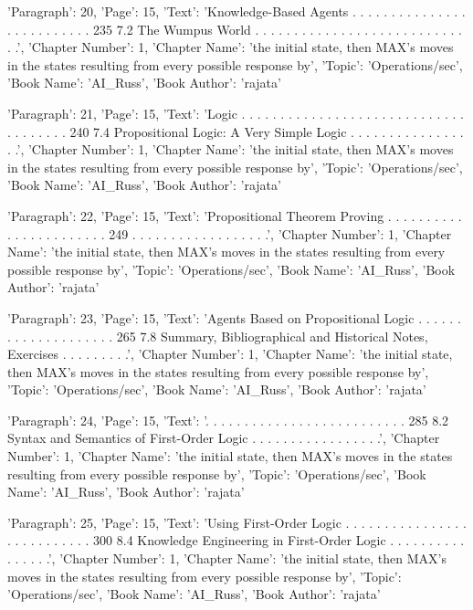 {'Paragraph': 20, 'Page': 15, 'Text': 'Knowledge-Based Agents . . . . . . . . . . . . . . . . . . . . . . . . . . 235 7.2 The Wumpus World . . . . . . . . . . . . . . . . . . . . . . . . . . . . .', 'Chapter Number': 1, 'Chapter Name': 'the initial state, then MAX’s moves in the states resulting from every possible response by', 'Topic': 'Operations/sec', 'Book Name': 'AI_Russ', 'Book Author': 'rajata'}

{'Paragraph': 21, 'Page': 15, 'Text': 'Logic . . . . . . . . . . . . . . . . . . . . . . . . . . . . . . . . . . . . . 240 7.4 Propositional Logic: A Very Simple Logic . . . . . . . . . . . . . . . . .', 'Chapter Number': 1, 'Chapter Name': 'the initial state, then MAX’s moves in the states resulting from every possible response by', 'Topic': 'Operations/sec', 'Book Name': 'AI_Russ', 'Book Author': 'rajata'}

{'Paragraph': 22, 'Page': 15, 'Text': 'Propositional Theorem Proving . . . . . . . . . . . . . . . . . . . . . . . 249 . . . . . . . . . . . . . . . . . .', 'Chapter Number': 1, 'Chapter Name': 'the initial state, then MAX’s moves in the states resulting from every possible response by', 'Topic': 'Operations/sec', 'Book Name': 'AI_Russ', 'Book Author': 'rajata'}

{'Paragraph': 23, 'Page': 15, 'Text': 'Agents Based on Propositional Logic . . . . . . . . . . . . . . . . . . . . 265 7.8 Summary, Bibliographical and Historical Notes, Exercises . . . . . . . . .', 'Chapter Number': 1, 'Chapter Name': 'the initial state, then MAX’s moves in the states resulting from every possible response by', 'Topic': 'Operations/sec', 'Book Name': 'AI_Russ', 'Book Author': 'rajata'}

{'Paragraph': 24, 'Page': 15, 'Text': '. . . . . . . . . . . . . . . . . . . . . . . . . . 285 8.2 Syntax and Semantics of First-Order Logic . . . . . . . . . . . . . . . . .', 'Chapter Number': 1, 'Chapter Name': 'the initial state, then MAX’s moves in the states resulting from every possible response by', 'Topic': 'Operations/sec', 'Book Name': 'AI_Russ', 'Book Author': 'rajata'}

{'Paragraph': 25, 'Page': 15, 'Text': 'Using First-Order Logic . . . . . . . . . . . . . . . . . . . . . . . . . . . 300 8.4 Knowledge Engineering in First-Order Logic . . . . . . . . . . . . . . . .', 'Chapter Number': 1, 'Chapter Name': 'the initial state, then MAX’s moves in the states resulting from every possible response by', 'Topic': 'Operations/sec', 'Book Name': 'AI_Russ', 'Book Author': 'rajata'}

